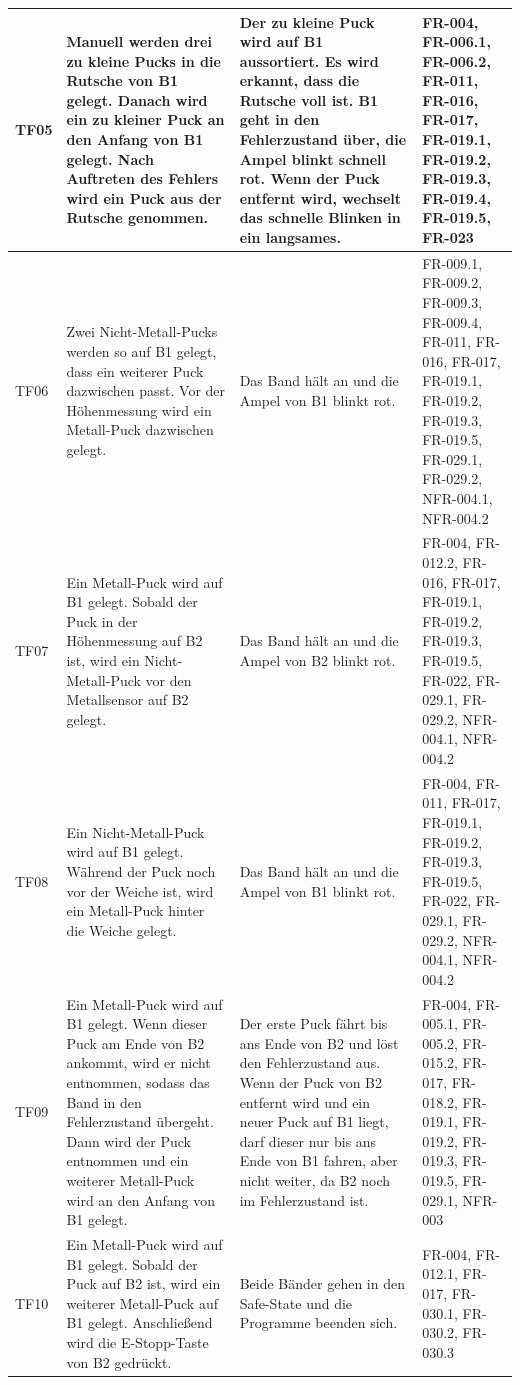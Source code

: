 \documentclass[oneside,a4paper,titlepage]{scrartcl} %
\begin{document}
\begin{small}
\begin{longtable}{|C{1.5cm}|L{4cm}|L{4.5cm}|C{3.0cm}|}
    \hline
    TF05 & Manuell werden drei zu kleine Pucks in die Rutsche von B1 gelegt. Danach wird ein zu kleiner Puck an den Anfang von B1 gelegt. Nach Auftreten des Fehlers wird ein Puck aus der Rutsche genommen. & Der zu kleine Puck wird auf B1 aussortiert. Es wird erkannt, dass die Rutsche voll ist. B1 geht in den Fehlerzustand über, die Ampel blinkt schnell rot. Wenn der Puck entfernt wird, wechselt das schnelle Blinken in ein langsames. & FR-004, FR-006.1, FR-006.2, FR-011, FR-016, FR-017, FR-019.1, FR-019.2, FR-019.3, FR-019.4, FR-019.5, FR-023\\
    \hline
     TF06 & Zwei Nicht-Metall-Pucks werden so auf B1 gelegt, dass ein weiterer Puck dazwischen passt. Vor der Höhenmessung wird ein Metall-Puck dazwischen gelegt. & Das Band hält an und die Ampel von B1 blinkt rot. & FR-009.1, FR-009.2, FR-009.3, FR-009.4, FR-011, FR-016, FR-017, FR-019.1, FR-019.2, FR-019.3, FR-019.5, FR-029.1, FR-029.2, NFR-004.1, NFR-004.2\\
    \hline
    TF07 & Ein Metall-Puck wird auf B1 gelegt. Sobald der Puck in der Höhenmessung auf B2 ist, wird ein Nicht-Metall-Puck vor den Metallsensor auf B2 gelegt. & Das Band hält an und die Ampel von B2 blinkt rot. & FR-004, FR-012.2, FR-016, FR-017, FR-019.1, FR-019.2, FR-019.3, FR-019.5, FR-022, FR-029.1, FR-029.2, NFR-004.1, NFR-004.2\\
    \hline
     TF08 & Ein Nicht-Metall-Puck wird auf B1 gelegt. Während der Puck noch vor der Weiche ist, wird ein Metall-Puck hinter die Weiche gelegt. & Das Band hält an und die Ampel von B1 blinkt rot. & FR-004, FR-011, FR-017, FR-019.1, FR-019.2, FR-019.3, FR-019.5, FR-022, FR-029.1, FR-029.2, NFR-004.1, NFR-004.2\\
    \hline
    TF09 & Ein Metall-Puck wird auf B1 gelegt. Wenn dieser Puck am Ende von B2 ankommt, wird er nicht entnommen, sodass das Band in den Fehlerzustand übergeht. Dann wird der Puck entnommen und ein weiterer Metall-Puck wird an den Anfang von B1 gelegt. & Der erste Puck fährt bis ans Ende von B2 und löst den Fehlerzustand aus. Wenn der Puck von B2 entfernt wird und ein neuer Puck auf B1 liegt, darf dieser nur bis ans Ende von B1 fahren, aber nicht weiter, da B2 noch im Fehlerzustand ist. & FR-004, FR-005.1, FR-005.2, FR-015.2, FR-017, FR-018.2, FR-019.1, FR-019.2, FR-019.3, FR-019.5, FR-029.1, NFR-003\\
    \hline
     TF10 & Ein Metall-Puck wird auf B1 gelegt. Sobald der Puck auf B2 ist, wird ein weiterer Metall-Puck auf B1 gelegt. Anschließend wird die E-Stopp-Taste von B2 gedrückt. & Beide Bänder gehen in den Safe-State und die Programme beenden sich. & FR-004, FR-012.1, FR-017, FR-030.1, FR-030.2, FR-030.3\\

\end{longtable}
\end{small}
\end{document}
